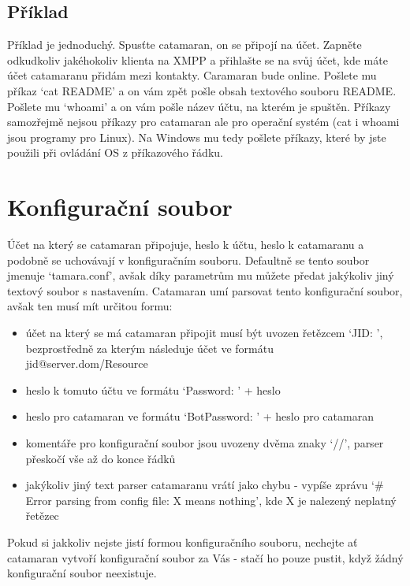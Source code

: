\documentclass[a4paper,11pt,titlepage]{article}
\begin{document}
\subsection{Příklad}
Příklad je jednoduchý. Spusťte catamaran, on se připojí na účet. Zapněte odkudkoliv jakéhokoliv klienta na XMPP a přihlašte se na svůj účet, kde máte účet catamaranu přidám mezi kontakty.
Caramaran bude online. Pošlete mu příkaz `cat README' a on vám zpět pošle obsah textového souboru README. Pošlete mu `whoami' a on vám pošle název účtu, na kterém je spuštěn. Příkazy
samozřejmě nejsou příkazy pro catamaran ale pro operační systém (cat i whoami jsou programy pro Linux). Na Windows mu tedy pošlete příkazy, které by jste použili při ovládání OS z příkazového
řádku.
\newpage
\section{Konfigurační soubor}
\label{konfigurak}
Účet na který se catamaran připojuje, heslo k účtu, heslo k catamaranu a podobně se uchovávají v konfiguračním souboru. Defaultně se tento soubor jmenuje `tamara.conf', avšak díky parametrům
mu můžete předat jakýkoliv jiný textový soubor s nastavením. Catamaran umí parsovat tento konfigurační soubor, avšak ten musí mít určitou formu:
\begin{itemize}
\item účet na který se má catamaran připojit musí být uvozen řetězcem `JID: ', bezprostředně za kterým následuje účet ve formátu \\ jid@server.dom/Resource
\item heslo k tomuto účtu ve formátu `Password: ' + heslo
\item heslo pro catamaran ve formátu `BotPassword: ' + heslo pro catamaran
\item komentáře pro konfigurační soubor jsou uvozeny dvěma znaky `//', parser přeskočí vše až do konce řádků
\item jakýkoliv jiný text parser catamaranu vrátí jako chybu - vypíše zprávu `\# Error parsing from config file: X means nothing', kde X je nalezený neplatný řetězec
\end{itemize}
Pokud si jakkoliv nejste jistí formou konfiguračního souboru, nechejte ať catamaran vytvoří konfigurační soubor za Vás - stačí ho pouze pustit, když žádný konfigurační soubor neexistuje.
\end{document}
